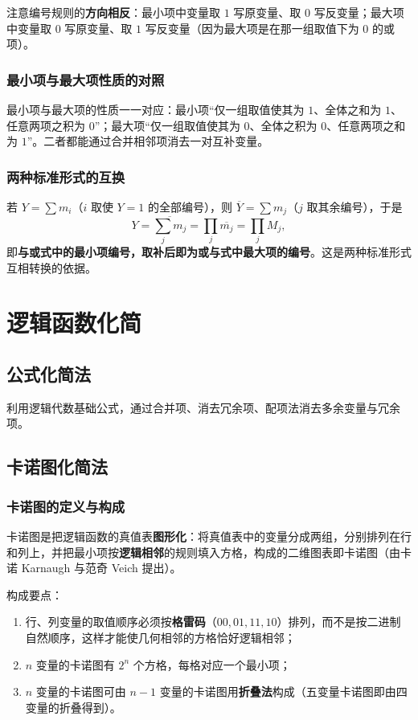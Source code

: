 注意编号规则的\textbf{方向相反}：最小项中变量取 $1$ 写原变量、取 $0$ 写反变量；最大项中变量取 $0$ 写原变量、取 $1$ 写反变量（因为最大项是在那一组取值下为 $0$ 的或项）。

\subsubsection{最小项与最大项性质的对照}
最小项与最大项的性质一一对应：最小项``仅一组取值使其为 $1$、全体之和为 $1$、任意两项之积为 $0$''；最大项``仅一组取值使其为 $0$、全体之积为 $0$、任意两项之和为 $1$''。二者都能通过合并相邻项消去一对互补变量。

\subsubsection{两种标准形式的互换}
若 $Y=\sum m_i$（$i$ 取使 $Y=1$ 的全部编号），则 $\overline{Y}=\sum m_j$（$j$ 取其余编号），于是
\[
Y=\overline{\sum_{j}m_j}=\prod_{j}\overline{m_j}=\prod_{j}M_j ,
\]
即\textbf{与或式中的最小项编号，取补后即为或与式中最大项的编号}。这是两种标准形式互相转换的依据。

\section{逻辑函数化简}
\subsection{公式化简法}
利用逻辑代数基础公式，通过合并项、消去冗余项、配项法消去多余变量与冗余项。

\subsection{卡诺图化简法}
\subsubsection{卡诺图的定义与构成}
卡诺图是把逻辑函数的真值表\textbf{图形化}：将真值表中的变量分成两组，分别排列在行和列上，并把最小项按\textbf{逻辑相邻}的规则填入方格，构成的二维图表即卡诺图（由卡诺 Karnaugh 与范奇 Veich 提出）。

构成要点：
\begin{enumerate}
    \item 行、列变量的取值顺序必须按\textbf{格雷码}（$00,01,11,10$）排列，而不是按二进制自然顺序，这样才能使几何相邻的方格恰好逻辑相邻；
    \item $n$ 变量的卡诺图有 $2^{n}$ 个方格，每格对应一个最小项；
    \item $n$ 变量的卡诺图可由 $n-1$ 变量的卡诺图用\textbf{折叠法}构成（五变量卡诺图即由四变量的折叠得到）。
\end{enumerate}

